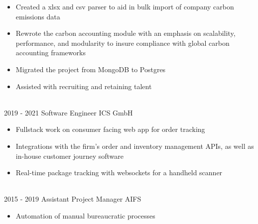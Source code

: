 \begin{entrylist}
{        \begin{itemize}[noitemsep,topsep=0pt,parsep=0pt,partopsep=0pt, leftmargin=-1pt]
            \item Created a xlsx and csv parser to aid in bulk import of company carbon emissions data
            \item Rewrote the carbon accounting module with an emphasis on scalability, performance, and modularity to insure compliance with global carbon accounting frameworks
            \item Migrated the project from MongoDB to Postgres
            \item Assisted with recruiting and retaining talent
        \end{itemize} 
        }\\
	\entry
		{2019 - 2021}
		{Software Engineer}
		{ICS GmbH}
		{\vspace{-10pt}
        \begin{itemize}[noitemsep,topsep=0pt,parsep=0pt,partopsep=0pt, leftmargin=-1pt]
            \item Fullstack work on consumer facing web app for order tracking
            \item Integrations with the firm's order and inventory management APIs, as well as in-house customer journey software
            \item Real-time package tracking with websockets for a handheld scanner
        \end{itemize} 
        }\\
	\entry
		{2015 - 2019}
		{Assistant Project Manager}
		{AIFS}
		{\vspace{-10pt}
        \begin{itemize}[noitemsep,topsep=0pt,parsep=0pt,partopsep=0pt, leftmargin=-1pt]
            \item Automation of manual bureaucratic processes

        \end{itemize} 
        }
\end{entrylist}
